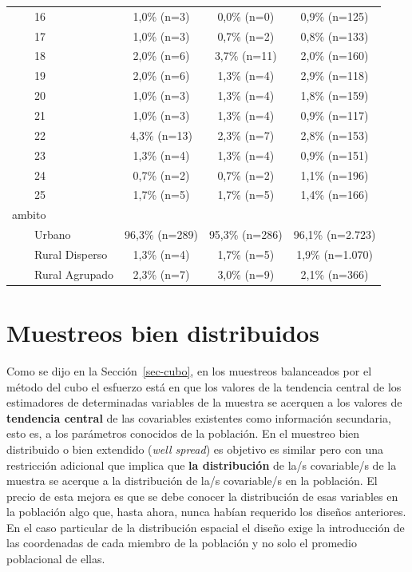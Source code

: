 \documentclass[
  spanish,
  a4paper,
]{scrreprt}
\begin{document}
\begin{table}
{\begin{tabular*}{\linewidth}{@{\extracolsep{\fill}}lccc}
    16 & 1,0\% (n=3) & 0,0\% (n=0) & 0,9\% (n=125) \\ 
    17 & 1,0\% (n=3) & 0,7\% (n=2) & 0,8\% (n=133) \\ 
    18 & 2,0\% (n=6) & 3,7\% (n=11) & 2,0\% (n=160) \\ 
    19 & 2,0\% (n=6) & 1,3\% (n=4) & 2,9\% (n=118) \\ 
    20 & 1,0\% (n=3) & 1,3\% (n=4) & 1,8\% (n=159) \\ 
    21 & 1,0\% (n=3) & 1,3\% (n=4) & 0,9\% (n=117) \\ 
    22 & 4,3\% (n=13) & 2,3\% (n=7) & 2,8\% (n=153) \\ 
    23 & 1,3\% (n=4) & 1,3\% (n=4) & 0,9\% (n=151) \\ 
    24 & 0,7\% (n=2) & 0,7\% (n=2) & 1,1\% (n=196) \\ 
    25 & 1,7\% (n=5) & 1,7\% (n=5) & 1,4\% (n=166) \\ 
ambito &  &  &  \\ 
    Urbano & 96,3\% (n=289) & 95,3\% (n=286) & 96,1\% (n=2.723) \\ 
    Rural Disperso & 1,3\% (n=4) & 1,7\% (n=5) & 1,9\% (n=1.070) \\ 
    Rural Agrupado & 2,3\% (n=7) & 3,0\% (n=9) & 2,1\% (n=366) \\ 
\bottomrule
\end{tabular*}

}

\end{table}%

\section{Muestreos bien distribuidos}\label{sec-bien_distribuido}

Como se dijo en la Sección~\ref{sec-cubo}, en los muestreos balanceados
por el método del cubo el esfuerzo está en que los valores de la
tendencia central de los estimadores de determinadas variables de la
muestra se acerquen a los valores de \textbf{tendencia central} de las
covariables existentes como información secundaria, esto es, a los
parámetros conocidos de la población. En el muestreo bien distribuido o
bien extendido (\emph{well spread}) es objetivo es similar pero con una
restricción adicional que implica que \textbf{la distribución} de la/s
covariable/s de la muestra se acerque a la distribución de la/s
covariable/s en la población. El precio de esta mejora es que se debe
conocer la distribución de esas variables en la población algo que,
hasta ahora, nunca habían requerido los diseños anteriores. En el caso
particular de la distribución espacial el diseño exige la introducción
de las coordenadas de cada miembro de la población y no solo el promedio
poblacional de ellas.
\end{document}
